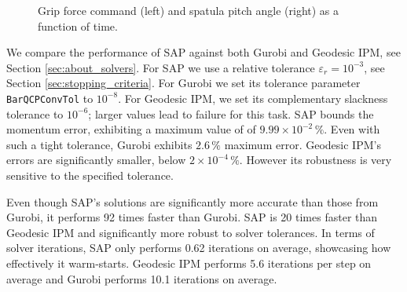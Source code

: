 \begin{figure}[!h]
	\centering
	\caption{\label{fig:slip_control_history} 
	Grip force command (left) and spatula pitch angle (right) as a function of time.}
\end{figure}

We compare the performance of SAP against both Gurobi and Geodesic IPM, see
Section \ref{sec:about_solvers}. For SAP we use a relative tolerance
$\varepsilon_r=10^{-3}$, see Section \ref{sec:stopping_criteria}. For Gurobi we
set its tolerance parameter \verb+BarQCPConvTol+ to $10^{-8}$. For Geodesic IPM,
we set its complementary slackness tolerance to $10^{-6}$; larger values lead to
failure for this task. SAP bounds the momentum error, exhibiting a maximum value
of of $9.99\times 10^{-2}\,\%$. Even with such a tight tolerance, Gurobi
exhibits $2.6\,\%$ maximum error. Geodesic IPM's errors are significantly
smaller, below $2\times 10^{-4}\,\%$. However its robustness is very sensitive
to the specified tolerance.

Even though SAP's solutions are significantly more accurate than those from
Gurobi, it performs 92 times faster than Gurobi. SAP is 20 times faster than
Geodesic IPM and significantly more robust to solver tolerances. In terms of
solver iterations, SAP only performs 0.62 iterations on average, showcasing how
effectively it warm-starts. Geodesic IPM performs 5.6
iterations per step on average and Gurobi performs 10.1 iterations on average.
